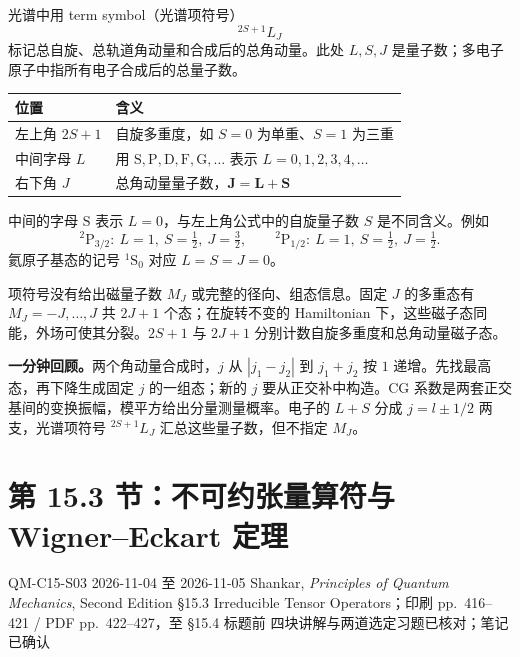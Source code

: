 光谱中用 term symbol（光谱项符号）
\begin{equation}
  \boxed{{}^{2S+1}L_J}
\end{equation}
标记总自旋、总轨道角动量和合成后的总角动量。此处 $L,S,J$ 是量子数；多电子原子中指所有电子合成后的总量子数。
\begin{center}
\begin{tabularx}{\textwidth}{@{}lX@{}}
  \toprule
  位置 & 含义 \\
  \midrule
  左上角 $2S+1$ & 自旋多重度，如 $S=0$ 为单重、$S=1$ 为三重 \\
  中间字母 $L$ & 用 $\mathrm S,\mathrm P,\mathrm D,\mathrm F,\mathrm G,\ldots$ 表示 $L=0,1,2,3,4,\ldots$ \\
  右下角 $J$ & 总角动量量子数，$\mathbf J=\mathbf L+\mathbf S$ \\
  \bottomrule
\end{tabularx}
\end{center}
中间的字母 $\mathrm S$ 表示 $L=0$，与左上角公式中的自旋量子数 $S$ 是不同含义。例如
\begin{equation}
  {}^2\mathrm P_{3/2}:\ L=1,\ S=\tfrac12,\ J=\tfrac32,
  \qquad
  {}^2\mathrm P_{1/2}:\ L=1,\ S=\tfrac12,\ J=\tfrac12.
\end{equation}
氦原子基态的记号 $ {}^1\mathrm S_0$ 对应 $L=S=J=0$。

项符号没有给出磁量子数 $M_J$ 或完整的径向、组态信息。固定 $J$ 的多重态有 $M_J=-J,\ldots,J$ 共 $2J+1$ 个态；在旋转不变的 Hamiltonian 下，这些磁子态同能，外场可使其分裂。$2S+1$ 与 $2J+1$ 分别计数自旋多重度和总角动量磁子态。

\textbf{一分钟回顾。}两个角动量合成时，$j$ 从 $|j_1-j_2|$ 到 $j_1+j_2$ 按 $1$ 递增。先找最高态，再下降生成固定 $j$ 的一组态；新的 $j$ 要从正交补中构造。CG 系数是两套正交基间的变换振幅，模平方给出分量测量概率。电子的 $L+S$ 分成 $j=l\pm1/2$ 两支，光谱项符号 $ {}^{2S+1}L_J$ 汇总这些量子数，但不指定 $M_J$。

\section{第 15.3 节：不可约张量算符与 Wigner--Eckart 定理}
\label{section:QM-C15-S03}
\studymeta
  {QM-C15-S03}
  {2026-11-04 至 2026-11-05}
  {Shankar, \textit{Principles of Quantum Mechanics}, Second Edition}
  {\S 15.3 Irreducible Tensor Operators；印刷 pp.~416--421 / PDF pp.~422--427，至 \S 15.4 标题前}
  {四块讲解与两道选定习题已核对；笔记已确认}



